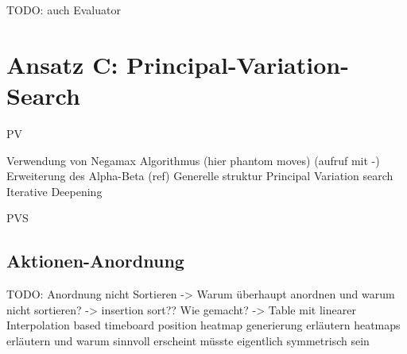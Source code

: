 TODO: auch Evaluator

\section{Ansatz C: Principal-Variation-Search}
\label{section:erstellung-ansatz-b}

\ac{PV}

Verwendung von Negamax Algorithmus (hier phantom moves) (aufruf mit -)
Erweiterung des Alpha-Beta (ref) Generelle struktur Principal Variation search
Iterative Deepening

\ac{PVS}

\subsection{Aktionen-Anordnung}

TODO:
\cite{2022.MoveOrdering}
Anordnung nicht Sortieren -> Warum überhaupt anordnen und warum nicht sortieren?
-> insertion sort??
Wie gemacht? -> Table mit linearer Interpolation based timeboard position
heatmap generierung erläutern
heatmaps erläutern und warum sinnvoll erscheint
müsste eigentlich symmetrisch sein

